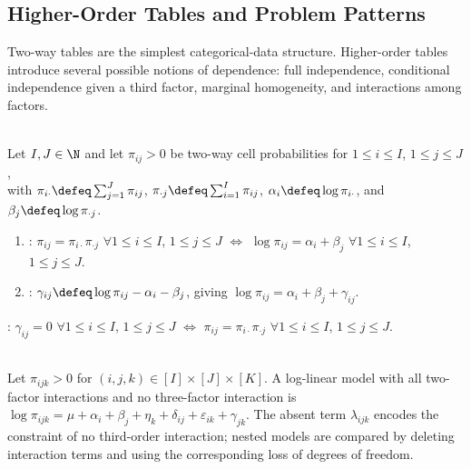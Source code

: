 \subsection{Higher-Order Tables and Problem Patterns}

Two-way tables are the simplest categorical-data structure.  Higher-order tables introduce several possible notions of dependence: full independence, conditional independence given a third factor, marginal homogeneity, and interactions among factors.

\begin{definition} \label{def:two-way-log-linear-independence} \\
Let $I,J\in\N$ and let $\pi_{ij}>0$ be two-way cell probabilities for $1\leq i\leq I$, $1\leq j\leq J$,\\
with $\pi_{i\cdot}\defeq\sum_{j=1}^{J}\pi_{ij}$, $\pi_{\cdot j}\defeq\sum_{i=1}^{I}\pi_{ij}$, $\alpha_i\defeq\log\pi_{i\cdot}$, and $\beta_j\defeq\log\pi_{\cdot j}$.
\begin{enumerate}[label=(\roman*)]
\setlength{\itemsep}{0pt}
\item {}: $\pi_{ij}=\pi_{i\cdot}\pi_{\cdot j}$ $\forall 1\leq i\leq I$, $1\leq j\leq J$ $\Longleftrightarrow$ $\log\pi_{ij}=\alpha_i+\beta_j$ $\forall 1\leq i\leq I$, $1\leq j\leq J$.
\item {}: $\gamma_{ij}\defeq\log\pi_{ij}-\alpha_i-\beta_j$, giving $\log\pi_{ij}=\alpha_i+\beta_j+\gamma_{ij}$.
\end{enumerate}
: $\gamma_{ij}=0$ $\forall 1\leq i\leq I$, $1\leq j\leq J$ $\Longleftrightarrow$ $\pi_{ij}=\pi_{i\cdot}\pi_{\cdot j}$ $\forall 1\leq i\leq I$, $1\leq j\leq J$.
\end{definition}

\begin{remark} \label{rem:three-way-log-linear-models} \\
Let $\pi_{ijk}>0$ for $(i,j,k)\in[I]\times[J]\times[K]$. A log-linear model with all two-factor interactions and no three-factor interaction is $\log\pi_{ijk}=\mu+\alpha_i+\beta_j+\eta_k+\delta_{ij}+\varepsilon_{ik}+\gamma_{jk}$. The absent term $\lambda_{ijk}$ encodes the constraint of no third-order interaction; nested models are compared by deleting interaction terms and using the corresponding loss of degrees of freedom.
\end{remark}

